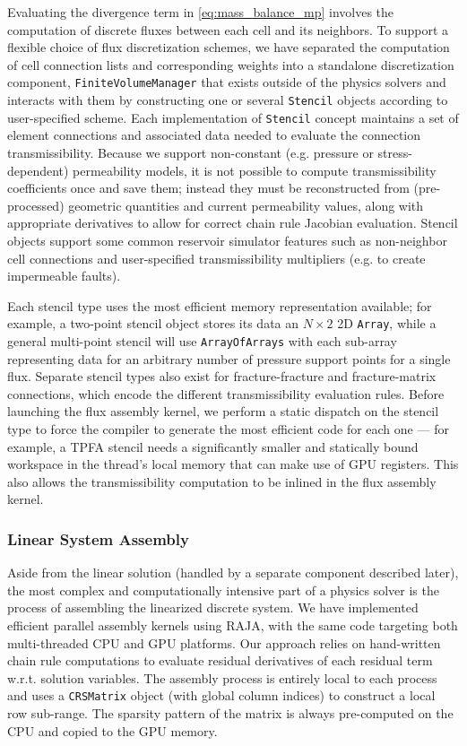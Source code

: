 Evaluating the divergence term in \cref{eq:mass_balance_mp} involves the computation of discrete fluxes between each cell and its neighbors.   To support a flexible choice of flux discretization schemes, we have separated the computation of cell connection lists and corresponding weights into a standalone discretization component, \texttt{FiniteVolumeManager} that exists outside of the physics solvers and interacts with them by constructing one or several \texttt{Stencil} objects according to user-specified scheme.   Each implementation of \texttt{Stencil} concept maintains a set of element connections and associated data needed to evaluate the connection transmissibility.   Because we support non-constant (e.g. pressure or stress-dependent) permeability models, it is not possible to compute transmissibility coefficients once and save them; instead they must be reconstructed from (pre-processed) geometric quantities and current permeability values, along with appropriate derivatives to allow for correct chain rule Jacobian evaluation.   Stencil objects support some common reservoir simulator features such as non-neighbor cell connections and user-specified transmissibility multipliers (e.g. to create impermeable faults).

Each stencil type uses the most efficient memory representation available; for example, a two-point stencil object stores its data an $N \times 2$ 2D \texttt{Array}, while a general multi-point stencil will use \texttt{ArrayOfArrays} with each sub-array representing data for an arbitrary number of pressure support points for a single flux.   Separate stencil types also exist for fracture-fracture and fracture-matrix connections, which encode the different transmissibility evaluation rules.   Before launching the flux assembly kernel, we perform a static dispatch on the stencil type to force the compiler to generate the most efficient code for each one --- for example, a TPFA stencil needs a significantly smaller and statically bound workspace in the thread's local memory that can make use of GPU registers.   This also allows the transmissibility computation to be inlined in the flux assembly kernel. 

\subsubsection{Linear System Assembly}

Aside from the linear solution (handled by a separate component described later), the most complex and computationally intensive part of a physics solver is the process of assembling the linearized discrete system.   We have implemented efficient parallel assembly kernels using RAJA, with the same code targeting both multi-threaded CPU and GPU platforms.   Our approach relies on hand-written chain rule computations to evaluate residual derivatives of each residual term w.r.t. solution variables.   The assembly process is entirely local to each process and uses a \texttt{CRSMatrix} object (with global column indices) to construct a local row sub-range.   The sparsity pattern of the matrix is always pre-computed on the CPU and copied to the GPU memory.

